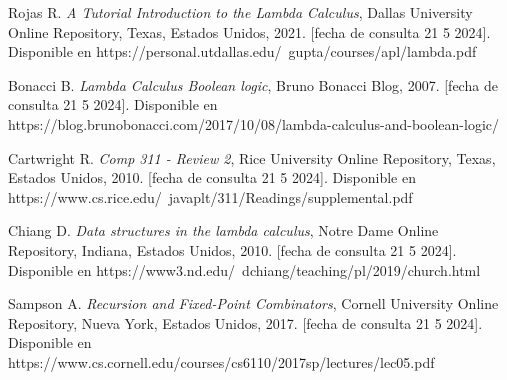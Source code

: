 \begin{thebibliography}{11}
     \bibitem{}
    \label{sec:109}
    \hypertarget{109}{}
    Rojas R. \textit{A Tutorial Introduction to the Lambda Calculus}, Dallas University Online Repository, Texas, Estados Unidos, 2021.  [fecha de consulta 21 5 2024]. Disponible en https://personal.utdallas.edu/~gupta/courses/apl/lambda.pdf

     \bibitem{}
    \label{sec:110}
    \hypertarget{110}{}
    Bonacci B. \textit{Lambda Calculus Boolean logic}, Bruno Bonacci Blog, 2007.  [fecha de consulta 21 5 2024]. Disponible en https://blog.brunobonacci.com/2017/10/08/lambda-calculus-and-boolean-logic/

     \bibitem{}
    \label{sec:111}
    \hypertarget{111}{}
    Cartwright R. \textit{Comp 311 - Review 2}, Rice University Online Repository, Texas, Estados Unidos, 2010.  [fecha de consulta 21 5 2024]. Disponible en https://www.cs.rice.edu/~javaplt/311/Readings/supplemental.pdf

     \bibitem{}
    \label{sec:112}
    \hypertarget{112}{}
    Chiang D. \textit{Data structures in the lambda calculus}, Notre Dame Online Repository, Indiana, Estados Unidos, 2010.  [fecha de consulta 21 5 2024]. Disponible en https://www3.nd.edu/~dchiang/teaching/pl/2019/church.html

     \bibitem{}
    \label{sec:113}
    \hypertarget{113}{}
    Sampson A. \textit{Recursion and Fixed-Point Combinators}, Cornell University Online Repository, Nueva York, Estados Unidos, 2017.  [fecha de consulta 21 5 2024]. Disponible en https://www.cs.cornell.edu/courses/cs6110/2017sp/lectures/lec05.pdf



\end{thebibliography}